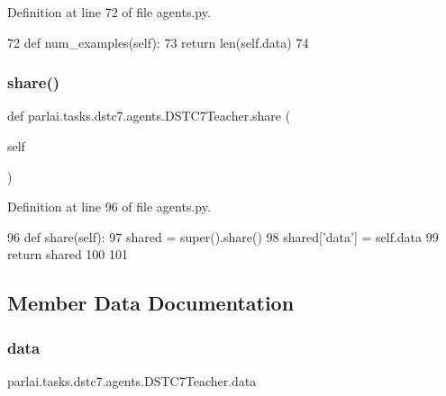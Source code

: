 Definition at line 72 of file agents.\+py.


\begin{DoxyCode}
72     \textcolor{keyword}{def }num\_examples(self):
73         \textcolor{keywordflow}{return} len(self.data)
74 
\end{DoxyCode}
\mbox{\label{classparlai_1_1tasks_1_1dstc7_1_1agents_1_1DSTC7Teacher_ae7b7bba23f2f3914186915824280a5d5}} 
\subsubsection{\texorpdfstring{share()}{share()}}
{\footnotesize\ttfamily def parlai.\+tasks.\+dstc7.\+agents.\+D\+S\+T\+C7\+Teacher.\+share (\begin{DoxyParamCaption}\item[{}]{self }\end{DoxyParamCaption})}



Definition at line 96 of file agents.\+py.


\begin{DoxyCode}
96     \textcolor{keyword}{def }share(self):
97         shared = super().share()
98         shared[\textcolor{stringliteral}{'data'}] = self.data
99         \textcolor{keywordflow}{return} shared
100 
101 
\end{DoxyCode}


\subsection{Member Data Documentation}
\mbox{\label{classparlai_1_1tasks_1_1dstc7_1_1agents_1_1DSTC7Teacher_a1410f6e230ea0a01e373e2dde387440a}} 
\subsubsection{\texorpdfstring{data}{data}}
{\footnotesize\ttfamily parlai.\+tasks.\+dstc7.\+agents.\+D\+S\+T\+C7\+Teacher.\+data}



